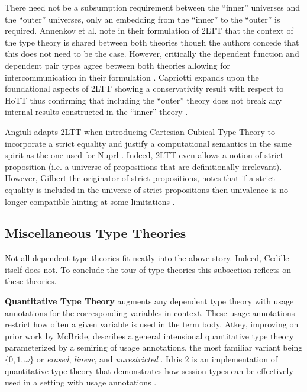 There need not be a subsumption requirement between the ``inner'' universes and the ``outer'' universes, only an embedding from the ``inner'' to the ``outer'' is required.
Annenkov et al. note in their formulation of 2LTT that the context of the type theory is shared between both theories though the authors concede that this does not need to be the case.
However, critically the dependent function and dependent pair types agree between both theories allowing for intercommunication in their formulation \cite{annenkov2017}.
Capriotti expands upon the foundational aspects of 2LTT showing a conservativity result with respect to HoTT thus confirming that including the ``outer'' theory does not break any internal results constructed in the ``inner'' theory \cite{capriotti2017}.

Angiuli adapts 2LTT when introducing Cartesian Cubical Type Theory to incorporate a strict equality and justify a computational semantics in the same spirit as the one used for Nuprl \cite{angiuli2019}.
Indeed, 2LTT even allows a notion of strict proposition (i.e. a universe of propositions that are definitionally irrelevant).
However, Gilbert the originator of strict propositions, notes that if a strict equality is included in the universe of strict propositions then univalence is no longer compatible hinting at some limitations \cite{gilbert2019}.

\subsection{Miscellaneous Type Theories}

Not all dependent type theories fit neatly into the above story.
Indeed, Cedille itself does not.
To conclude the tour of type theories this subsection reflects on these theories.

\textbf{Quantitative Type Theory} augments any dependent type theory with usage annotations for the corresponding variables in context.
These usage annotations restrict how often a given variable is used in the term body.
Atkey, improving on prior work by McBride, describes a general intensional quantitative type theory parameterized by a semiring of usage annotations, the most familiar variant being $\{ 0, 1, \omega \}$ or \textit{erased}, \textit{linear}, and \textit{unrestricted} \cite{atkey2018}.
Idris 2 is an implementation of quantitative type theory that demonstrates how session types can be effectively used in a setting with usage annotations \cite{brady2021}.

